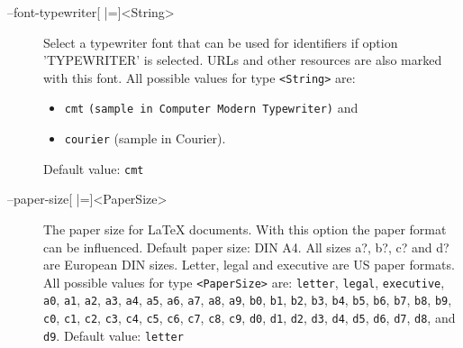 \begin{description}
\item[--font-typewriter{[} |={]}<String>]
  Select a typewriter font that can be used for identifiers if
  option 'TYPEWRITER' is selected. URLs and other resources are
  also marked with this font.
  All possible values for type \texttt{<String>} are:
  \begin{itemize}
  \item\texttt{cmt} \texttt{(sample in Computer Modern Typewriter)} and
  \item\texttt{courier} {\selectfont (sample in Courier)}.
  \end{itemize}
  Default value: \texttt{cmt}

\item[--paper-size{[} |={]}<PaperSize>]
  The paper size for \LaTeX{} documents. With this option the paper
  format can be influenced. Default paper size: DIN A4. All sizes
  a?, b?, c? and d? are European DIN sizes. Letter, legal and
  executive are US paper formats.
  All possible values for type \texttt{<PaperSize>} are:
  \texttt{letter}, \texttt{legal},
  \texttt{executive}, \texttt{a0},
  \texttt{a1}, \texttt{a2},
  \texttt{a3}, \texttt{a4},
  \texttt{a5}, \texttt{a6},
  \texttt{a7}, \texttt{a8},
  \texttt{a9}, \texttt{b0},
  \texttt{b1}, \texttt{b2},
  \texttt{b3}, \texttt{b4},
  \texttt{b5}, \texttt{b6},
  \texttt{b7}, \texttt{b8},
  \texttt{b9}, \texttt{c0},
  \texttt{c1}, \texttt{c2},
  \texttt{c3}, \texttt{c4},
  \texttt{c5}, \texttt{c6},
  \texttt{c7}, \texttt{c8},
  \texttt{c9}, \texttt{d0},
  \texttt{d1}, \texttt{d2},
  \texttt{d3}, \texttt{d4},
  \texttt{d5}, \texttt{d6},
  \texttt{d7}, \texttt{d8},
  and \texttt{d9}.
  Default value: \texttt{letter}
\end{description}

